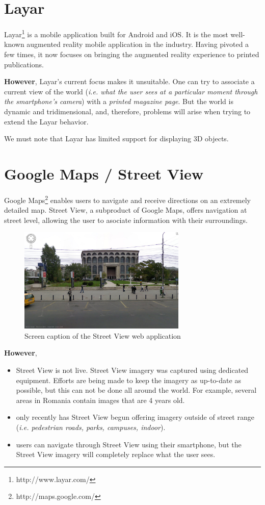 \documentclass[a4paper,onecolumn,oneside,titlepage,11pt]{report}
\begin{document}
\section{Layar}
Layar\footnote{http://www.layar.com/} is a mobile application built for Android and iOS. It is the most well-known augmented reality mobile application in the industry. Having pivoted a few times, it now focuses on bringing the augmented reality experience to printed publications.

\textbf{However}, Layar's current focus makes it unsuitable. One can try to associate a current view of the world (\emph{i.e. what the user sees at a particular moment through the smartphone's camera}) with a \emph{printed magazine page}. But the world is dynamic and tridimensional, and, therefore, problems will arise when trying to extend the Layar behavior.

We must note that Layar has limited support for displaying 3D objects.
\section{Google Maps / Street View}
Google Maps\footnote{http://maps.google.com/} enables users to navigate and receive directions on an extremely detailed map. Street View, a subproduct of Google Maps, offers navigation at street level, allowing the user to asociate information with their surroundings.

\begin{figure}[H]
\begin{center}
\includegraphics[width=8cm]{../../images/tnb_streetview.png}
\caption{Screen caption of the Street View web application}
\end{center}
\end{figure}

\textbf{However},
\begin{itemize}
	\item Street View is not live. Street View imagery was captured using dedicated equipment. Efforts are being made to keep the imagery as up-to-date as possible, but this can not be done all around the world. For example, several areas in Romania contain images that are 4 years old.
	\item only recently has Street View begun offering imagery outside of street range (\emph{i.e. pedestrian roads, parks, campuses, indoor}).
	\item users can navigate through Street View using their smartphone, but the Street View imagery will completely replace what the user sees.
\end{itemize}
\end{document}
